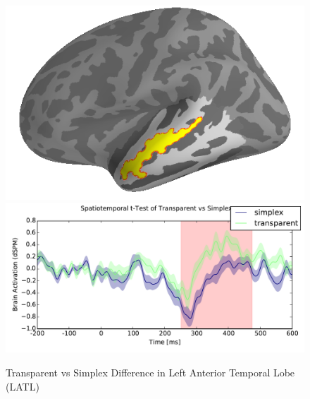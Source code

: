 \documentclass{frontiersSCNS}
\begin{document}
\begin{figure}
\begin{centering}
\includegraphics[scale=0.50]{images/transparent_prime_brain_analysis}\includegraphics[scale=0.50]{images/transparent_prime_analysis}
\par\end{centering}
\caption{\label{fig:transparent_primes} Transparent vs Simplex Difference in Left Anterior Temporal Lobe (LATL)}
\end{figure}
\end{document}
